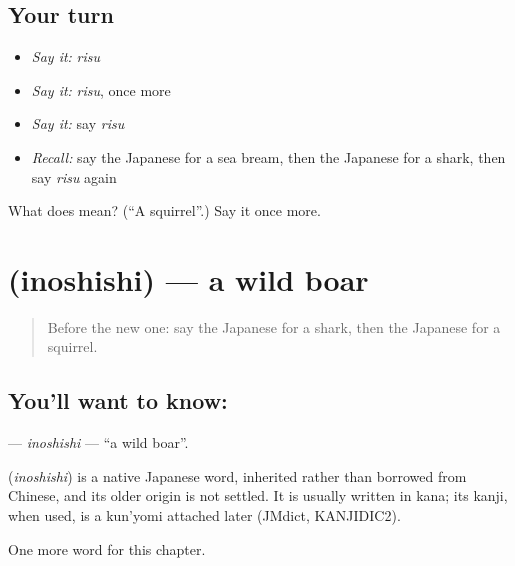 \subsection*{Your turn}
\begin{itemize}
\raggedright
  \item \emph{Say it:} \emph{risu}
  \item \emph{Say it:} \emph{risu}, once more
  \item \emph{Say it:} say \emph{risu}
  \item \emph{Recall:} say the Japanese for a sea bream, then the Japanese for a shark, then say \emph{risu} again
\end{itemize}

\begin{tcolorbox}[breakable,colback=teal!4,colframe=teal!35!black,title={Before you move on}]
What does  mean? (\textquotedblleft{}A squirrel\textquotedblright{}.) Say it once more.
\end{tcolorbox}
\section[\texorpdfstring{\ja{いのしし} (inoshishi)}{いのしし (inoshishi)}]{ (inoshishi) — a wild boar}

\label{lesson:JA-C108-inoshishi}



\begin{quote}
Before the new one: say the Japanese for a shark, then the Japanese for a squirrel.
\end{quote}

\subsection*{You'll want to know: }
\textbf{} — \emph{inoshishi} — \textquotedblleft{}a wild boar\textquotedblright{}.

\begin{cousinweb}
\textbf{} (\emph{inoshishi}) is a native Japanese word, inherited rather than borrowed from Chinese, and its older origin is not settled. It is usually written in kana; its kanji, when used, is a kun'yomi attached later (JMdict, KANJIDIC2).
\end{cousinweb}

\begin{grammarlens}[title={What you've built}]
One more word for this chapter.
\end{grammarlens}

